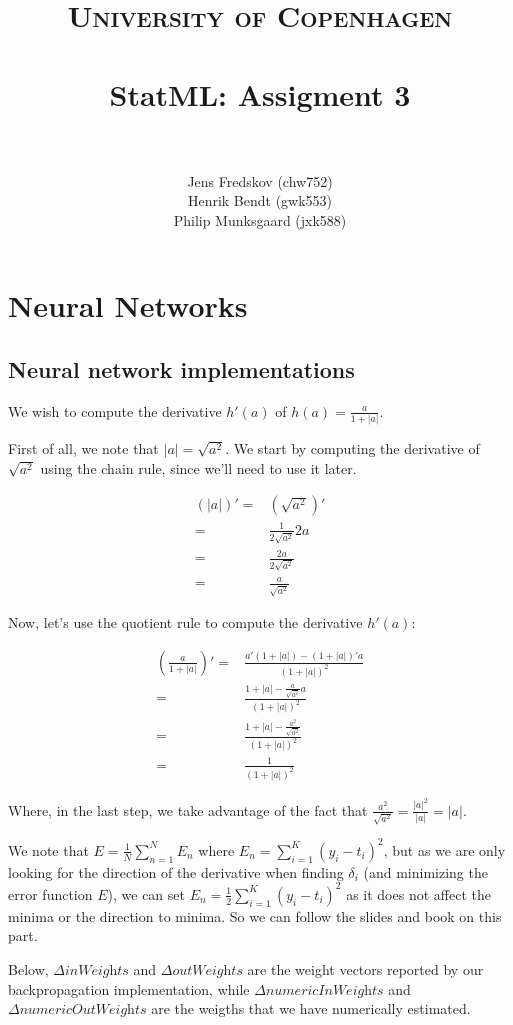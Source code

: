 \documentclass[a4paper, 11pt]{article}
\title{ 
\normalfont \normalsize 
\textsc{University of Copenhagen} \\ [25pt]
\horrule{0.5pt} \\[0.4cm]
\huge StatML: Assigment 3\\
\horrule{2pt} \\[0.5cm]
}
\author{Jens Fredskov (chw752)\\Henrik Bendt (gwk553)\\Philip Munksgaard (jxk588)}
\begin{document}
\maketitle

\section{Neural Networks}

\subsection{Neural network implementations}

We wish to compute the derivative $h'(a)$ of $h(a) = \frac{a}{1+|a|}$.

First of all, we note that $|a| = \sqrt{a^2}$. We start by computing the derivative of $\sqrt{a^2}$ using the chain rule, since we'll need to use it later.

\begin{align*}
    (|a|)' =& (\sqrt{a^2})' \\
    =& \frac{1}{2\sqrt{a^2}} 2a \\
    =& \frac{2a}{2\sqrt{a^2}} \\
    =& \frac{a}{\sqrt{a^2}}
\end{align*}

Now, let's use the quotient rule to compute the derivative $h'(a)$:

\begin{align*}
    \left( \frac{a}{1+|a|} \right) ' =& \frac{a'(1+|a|)-(1+|a|)'a}{(1+|a|)^2} \\
    =& \frac{1 + |a| - \frac{a}{\sqrt{a^2}} a}{(1 + |a|)^2} \\
    =& \frac{1 + |a| - \frac{a^2}{\sqrt{a^2}}}{(1 + |a|)^2} \\
    =& \frac{1}{(1 + |a|)^2}
\end{align*}

Where, in the last step, we take advantage of the fact that $\frac{a^2}{\sqrt{a^2}} = \frac{|a|^2}{|a|}= |a|$.

We note that $E = \frac{1}{N} \sum_{n=1}^N E_n$ where $E_n = \sum_{i=1}^K(y_i-t_i)^2$, but as we are only looking for the direction of the derivative when finding $\delta_i$ (and minimizing the error function $E$), we can set $E_n = \frac{1}{2}\sum_{i=1}^K(y_i-t_i)^2$ as it does not affect the minima or the direction to minima. So we can follow the slides and book on this part.

Below, $\Delta \textit{inWeights}$ and $\Delta \textit{outWeights}$ are the weight vectors reported by our backpropagation implementation, while $\Delta \textit{numericInWeights}$ and \\ $\Delta \textit{numericOutWeights}$ are the weigths that we have numerically estimated.
\end{document}
